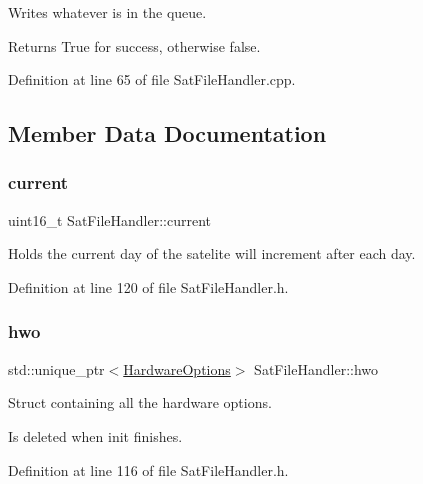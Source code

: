Writes whatever is in the queue. 

\begin{DoxyReturn}{Returns}
True for success, otherwise false. 
\end{DoxyReturn}


Definition at line 65 of file Sat\+File\+Handler.\+cpp.



\subsection{Member Data Documentation}
\mbox{\label{class_sat_file_handler_ac61d216e89063d7c2a62071a6d89ad34}} 
\subsubsection{\texorpdfstring{current}{current}}
{\footnotesize\ttfamily uint16\+\_\+t Sat\+File\+Handler\+::current\hspace{0.3cm}{\ttfamily [private]}}



Holds the current day of the satelite will increment after each day. 



Definition at line 120 of file Sat\+File\+Handler.\+h.

\mbox{\label{class_sat_file_handler_a26220c492649c0424010e21de171259e}} 
\subsubsection{\texorpdfstring{hwo}{hwo}}
{\footnotesize\ttfamily std\+::unique\+\_\+ptr$<$\mbox{\hyperlink{struct_sat_file_handler_1_1_hardware_options}{Hardware\+Options}}$>$ Sat\+File\+Handler\+::hwo\hspace{0.3cm}{\ttfamily [private]}}



Struct containing all the hardware options. 

Is deleted when init finishes. 

Definition at line 116 of file Sat\+File\+Handler.\+h.

\mbox{\label{class_sat_file_handler_a871dee72893c3b9452a1f181b33103df}} 
